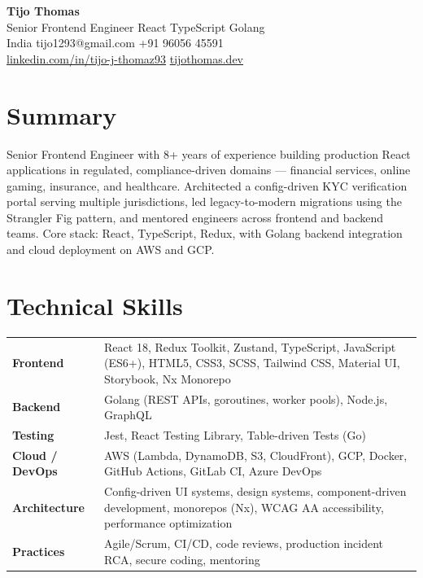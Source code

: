 \documentclass[11pt,a4paper]{article}
\begin{document}
\begin{center}
{\LARGE \textbf{Tijo Thomas}} \\[4pt]
{\large Senior Frontend Engineer \textbar{} React \textbar{} TypeScript \textbar{} Golang} \\[6pt]
India \enspace\textbar\enspace
tijo1293@gmail.com \enspace\textbar\enspace
+91 96056 45591 \\[2pt]
\href{https://linkedin.com/in/tijo-j-thomaz93}{linkedin.com/in/tijo-j-thomaz93} \enspace\textbar\enspace
\href{https://tijothomas.dev}{tijothomas.dev}
\end{center}

\section*{Summary}

Senior Frontend Engineer with 8+ years of experience building production React applications in regulated, compliance-driven domains — financial services, online gaming, insurance, and healthcare. Architected a config-driven KYC verification portal serving multiple jurisdictions, led legacy-to-modern migrations using the Strangler Fig pattern, and mentored engineers across frontend and backend teams. Core stack: React, TypeScript, Redux, with Golang backend integration and cloud deployment on AWS and GCP.

\section*{Technical Skills}

\begin{tabular}{@{} p{2.8cm} p{14cm} @{}}
\textbf{Frontend} & React 18, Redux Toolkit, Zustand, TypeScript, JavaScript (ES6+), HTML5, CSS3, SCSS, Tailwind CSS, Material UI, Storybook, Nx Monorepo \\[3pt]
\textbf{Backend} & Golang (REST APIs, goroutines, worker pools), Node.js, GraphQL \\[3pt]
\textbf{Testing} & Jest, React Testing Library, Table-driven Tests (Go) \\[3pt]
\textbf{Cloud / DevOps} & AWS (Lambda, DynamoDB, S3, CloudFront), GCP, Docker, GitHub Actions, GitLab CI, Azure DevOps \\[3pt]
\textbf{Architecture} & Config-driven UI systems, design systems, component-driven development, monorepos (Nx), WCAG AA accessibility, performance optimization \\[3pt]
\textbf{Practices} & Agile/Scrum, CI/CD, code reviews, production incident RCA, secure coding, mentoring \\
\end{tabular}
\end{document}
